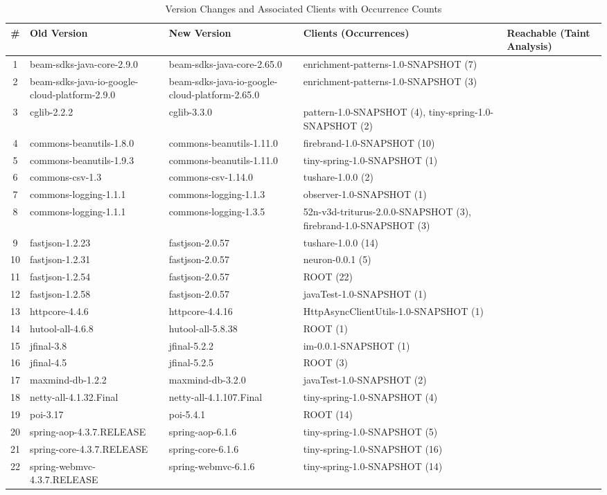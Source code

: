 \begin{table*}[hbt!]
\centering
\caption{Version Changes and Associated Clients with Occurrence Counts}
\label{tab:version-distribution}
\begin{tabular}{c >{\raggedright\arraybackslash}p{3.5cm} >{\raggedright\arraybackslash}p{3.5cm} >{\raggedright\arraybackslash}p{6cm} >{\centering\arraybackslash}p{2cm}}
\toprule
\# & \textbf{Old Version} & \textbf{New Version} & \textbf{Clients (Occurrences)} & \textbf{Reachable (Taint Analysis)} \\
\midrule
1 & beam-sdks-java-core-2.9.0 & beam-sdks-java-core-2.65.0 & enrichment-patterns-1.0-SNAPSHOT (7) & \\
2 & beam-sdks-java-io-google-cloud-platform-2.9.0 & beam-sdks-java-io-google-cloud-platform-2.65.0 & enrichment-patterns-1.0-SNAPSHOT (3) & \\
3 & cglib-2.2.2 & cglib-3.3.0 & pattern-1.0-SNAPSHOT (4), tiny-spring-1.0-SNAPSHOT (2) & \\
4 & commons-beanutils-1.8.0 & commons-beanutils-1.11.0 & firebrand-1.0-SNAPSHOT (10) & \\
5 & commons-beanutils-1.9.3 & commons-beanutils-1.11.0 & tiny-spring-1.0-SNAPSHOT (1) & \\
6 & commons-csv-1.3 & commons-csv-1.14.0 & tushare-1.0.0 (2) & \\
7 & commons-logging-1.1.1 & commons-logging-1.1.3 & observer-1.0-SNAPSHOT (1) & \\
8 & commons-logging-1.1.1 & commons-logging-1.3.5 & 52n-v3d-triturus-2.0.0-SNAPSHOT (3), firebrand-1.0-SNAPSHOT (3) & \\
9 & fastjson-1.2.23 & fastjson-2.0.57 & tushare-1.0.0 (14) & \\
10 & fastjson-1.2.31 & fastjson-2.0.57 & neuron-0.0.1 (5) & \\
11 & fastjson-1.2.54 & fastjson-2.0.57 & ROOT (22) & \\
12 & fastjson-1.2.58 & fastjson-2.0.57 & javaTest-1.0-SNAPSHOT (1) & \\
13 & httpcore-4.4.6 & httpcore-4.4.16 & HttpAsyncClientUtils-1.0-SNAPSHOT (1) & \\
14 & hutool-all-4.6.8 & hutool-all-5.8.38 & ROOT (1) & \\
15 & jfinal-3.8 & jfinal-5.2.2 & im-0.0.1-SNAPSHOT (1) & \\
16 & jfinal-4.5 & jfinal-5.2.5 & ROOT (3) & \\
17 & maxmind-db-1.2.2 & maxmind-db-3.2.0 & javaTest-1.0-SNAPSHOT (2) & \\
18 & netty-all-4.1.32.Final & netty-all-4.1.107.Final & tiny-spring-1.0-SNAPSHOT (4) & \\
19 & poi-3.17 & poi-5.4.1 & ROOT (14) & \\
20 & spring-aop-4.3.7.RELEASE & spring-aop-6.1.6 & tiny-spring-1.0-SNAPSHOT (5) & \\
21 & spring-core-4.3.7.RELEASE & spring-core-6.1.6 & tiny-spring-1.0-SNAPSHOT (16) & \\
22 & spring-webmvc-4.3.7.RELEASE & spring-webmvc-6.1.6 & tiny-spring-1.0-SNAPSHOT (14) & \\
\bottomrule
\end{tabular}
\end{table*}


